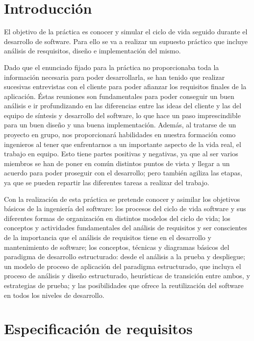 \documentclass[12pt,a4paper,spanish,twoside]{article}
\begin{document}
\tableofcontents
\newpage
\section{Introducción}
El objetivo de la práctica es conocer y simular el ciclo de vida seguido
durante el desarrollo de software. Para ello se va a realizar un supuesto
práctico que incluye análisis de resquisitos, diseño e implementación del
mismo. 

Dado que el enunciado fijado para la práctica no proporcionaba toda la
información necesaria para poder desarrollarla, se han tenido que realizar
sucesivas entrevistas con el cliente para poder afianzar los requisitos finales
de la aplicación. Éstas reuniones son fundamentales para poder conseguir un
buen análisis e ir profundizando en las diferencias entre las ideas del
cliente y las del equipo de síntesis y desarrollo del software, lo que hace
un paso imprescindible para un buen diseño y una buena
implementación. Además, al tratarse de un proyecto en grupo, nos
proporcionará habilidades en nuestra formación como ingenieros al tener que
enfrentarnos a un importante aspecto de la vida real, el trabajo en
equipo. Esto tiene partes positivas y negativas, ya que al ser varios
miembros se han de poner en común distintos puntos de vista y llegar a un
acuerdo para poder proseguir con el desarrollo; pero también agiliza las
etapas, ya que se pueden repartir las diferentes tareas a realizar del
trabajo. 

Con la realización de esta práctica se pretende conocer y asimilar los
objetivos básicos de la ingeniería del software: los procesos del ciclo de
vida software y sus diferentes formas de organización en distintos modelos
del ciclo de vida; los conceptos y actividades fundamentales del análisis
de requisitos y ser conscientes de la importancia que el análisis de
requisitos tiene en el desarrollo y mantenimiento de software; los conceptos,
técnicas y diagramas básicos del paradigma de desarrollo estructurado: desde
el análisis a la prueba y despliegue; un modelo de proceso de aplicación del
paradigma estructurado, que incluya el proceso de análisis y diseño
estructurado, heurísticas de transición entre ambos, y estrategias de prueba;
y las posibilidades que ofrece la reutilización del software en todos los
niveles de desarrollo. 

\section{Especificación de requisitos}
\end{document}
